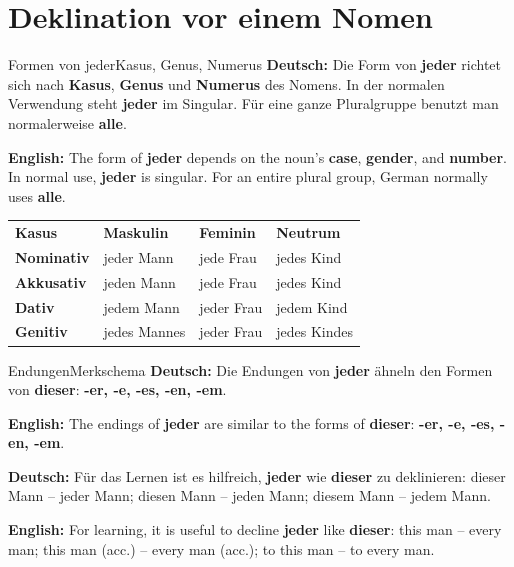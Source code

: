 \documentclass[a4paper,11pt]{article}
\newcommand{\GermanText}[1]{\textbf{Deutsch: }#1\par}
\newcommand{\EnglishText}[1]{{\small\color{SoftGray}\textbf{English: }#1\par}}
\begin{document}
\section{Deklination vor einem Nomen}
\begin{grammarentry}{Formen von jeder}{Kasus, Genus, Numerus}
\GermanText{Die Form von \textbf{jeder} richtet sich nach \textbf{Kasus}, \textbf{Genus} und \textbf{Numerus} des Nomens. In der normalen Verwendung steht \textbf{jeder} im Singular. Für eine ganze Pluralgruppe benutzt man normalerweise \textbf{alle}.}
\EnglishText{The form of \textbf{jeder} depends on the noun's \textbf{case}, \textbf{gender}, and \textbf{number}. In normal use, \textbf{jeder} is singular. For an entire plural group, German normally uses \textbf{alle}.}
\end{grammarentry}

\begin{longtable}{>{\bfseries}p{2.7cm}|>{\centering\arraybackslash}p{3.2cm}|>{\centering\arraybackslash}p{3.2cm}|>{\centering\arraybackslash}p{3.2cm}}
\rowcolor{HeaderBlueDark}
\color{white}\textbf{Kasus} &
\color{white}\textbf{Maskulin} &
\color{white}\textbf{Feminin} &
\color{white}\textbf{Neutrum} \\
Nominativ & jeder Mann & jede Frau & jedes Kind \\
Akkusativ & jeden Mann & jede Frau & jedes Kind \\
Dativ & jedem Mann & jeder Frau & jedem Kind \\
Genitiv & jedes Mannes & jeder Frau & jedes Kindes \\
\end{longtable}

\begin{grammarentry}{Endungen}{Merkschema}
\GermanText{Die Endungen von \textbf{jeder} ähneln den Formen von \textbf{dieser}: \textbf{-er, -e, -es, -en, -em}.}
\EnglishText{The endings of \textbf{jeder} are similar to the forms of \textbf{dieser}: \textbf{-er, -e, -es, -en, -em}.}
\GermanText{Für das Lernen ist es hilfreich, \textbf{jeder} wie \textbf{dieser} zu deklinieren: dieser Mann -- jeder Mann; diesen Mann -- jeden Mann; diesem Mann -- jedem Mann.}
\EnglishText{For learning, it is useful to decline \textbf{jeder} like \textbf{dieser}: this man -- every man; this man (acc.) -- every man (acc.); to this man -- to every man.}
\end{grammarentry}
\end{document}
